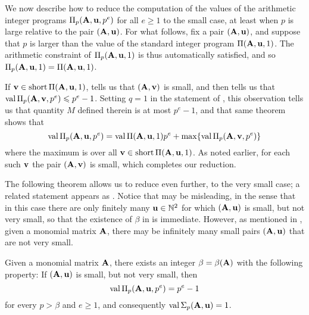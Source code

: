 \documentclass{amsart}
\begin{document}
\begin{remark}
   We now describe how to reduce the computation of the values of the arithmetic integer programs $\Pi_p(\mathbf{A}, \mathbf{u}, p^e)$ for all $e \geq 1$ to the small case, at least when $p$ is large relative to the pair $(\mathbf{A}, \mathbf{u})$.
   For what follows, fix a pair $(\mathbf{A}, \mathbf{u})$, and suppose that $p$ is larger than the value of the standard integer program $\Pi(\mathbf{A}, \mathbf{u},1)$.
   The arithmetic constraint of $\Pi_p(\mathbf{A},\mathbf{u},1)$ is thus automatically satisfied, and so $\Pi_p(\mathbf{A}, \mathbf{u}, 1) = \Pi(\mathbf{A}, \mathbf{u}, 1)$.

   If $\mathbf{v} \in \operatorname{short} \Pi(\mathbf{A},\mathbf{u},1)$,  tells us that $(\mathbf{A}, \mathbf{v})$ is small, and   then tells us that $\operatorname{val} \Pi_p(\mathbf{A}, \mathbf{v}, p^e) \leqslant p^e-1$.
   Setting $q=1$ in the statement of , this observation tells us that quantity $M$ defined therein is at most $p^e-1$, and that same theorem shows that
   \[ \operatorname{val} \Pi_p(\mathbf{A}, \mathbf{u},p^e) = \operatorname{val} \Pi(\mathbf{A}, \mathbf{u},1)p^e + \max \{ \operatorname{val} \Pi_p(\mathbf{A}, \mathbf{v}, p^e) \}\]
   where the maximum is over all $\mathbf{v} \in \operatorname{short} \Pi(\mathbf{A}, \mathbf{u},1)$.
   As noted earlier, for each such $\mathbf{v}$ the pair $(\mathbf{A},\mathbf{v})$ is small, which completes our reduction.
\end{remark}

The following theorem allows us to reduce even further, to the very small case; a related statement appears as \cite[Theorem~6.4]{hernandez+etal.frobenius_powers}.
Notice that  may be misleading, in the sense that in this case there are only finitely many $\mathbf{u} \in \mathbb{N}^2$ for which $(\mathbf{A}, \mathbf{u})$ is small, but not very small, so that the existence of $\beta$ in  is immediate.
However, as mentioned in , given a monomial matrix $\mathbf{A}$, there may be infinitely many small pairs $(\mathbf{A}, \mathbf{u})$ that are not very small.

\begin{theorem}
   \label{small not very small value: T}
   Given a monomial matrix $\mathbf{A}$, there exists an integer $\beta=\beta(\mathbf{A})$ with the following property\textup:
   If $(\mathbf{A}, \mathbf{u})$ is small, but not very small, then
   \[ \operatorname{val} \Pi_p(\mathbf{A}, \mathbf{u}, p^e) = p^e-1\]
   for every $p > \beta$ and $e \geq 1$, and consequently $\operatorname{val} \Sigma_p(\mathbf{A},\mathbf{u}) = 1$.
\end{theorem}
\end{document}
